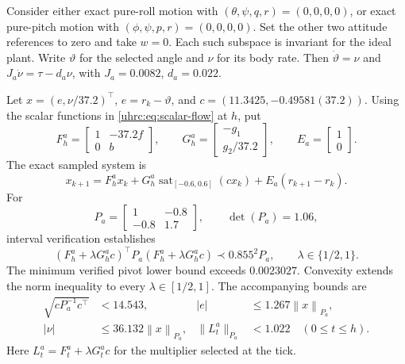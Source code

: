 \documentclass[12pt, a4paper]{article}
\begin{document}
Consider either exact pure-roll motion with
$(\theta,\psi,q,r)=(0,0,0,0)$, or exact pure-pitch motion with
$(\phi,\psi,p,r)=(0,0,0,0)$. Set the other two attitude references to zero
and take $w=0$. Each such subspace is invariant for the ideal plant.
Write $\vartheta$ for the selected angle and $\nu$ for its body rate.
Then $\dot\vartheta=\nu$ and
$J_a\dot\nu=\tau-d_a\nu$, with $J_a=0.0082$, $d_a=0.022$.

Let $x=(e,\nu/37.2)^\top$, $e=r_k-\vartheta$, and
$c=(11.3425,-0.49581(37.2))$.
Using the scalar functions in \eqref{uhrc:eq:scalar-flow} at $h$, put
\begin{equation}
 F_h^a=\begin{bmatrix}1&-37.2f\\0&b\end{bmatrix},\qquad
 G_h^a=\begin{bmatrix}-g_1\\g_2/37.2\end{bmatrix},\qquad
 E_a=\begin{bmatrix}1\\0\end{bmatrix}.
 \label{uhrc:eq:planar-maps}
\end{equation}
The exact sampled system is
\begin{equation}
 x_{k+1}=F_h^ax_k+G_h^a\operatorname{sat}_{[-0.6,0.6]}(cx_k)
                              +E_a(r_{k+1}-r_k).
 \label{uhrc:eq:planar-dynamics}
\end{equation}
For
\begin{equation}
 P_a=\begin{bmatrix}1&-0.8\\-0.8&1.7\end{bmatrix},
 \qquad \det(P_a)=1.06,
 \label{uhrc:eq:Pa}
\end{equation}
interval verification establishes
\begin{equation}
 (F_h^a+\lambda G_h^ac)^\top P_a(F_h^a+\lambda G_h^ac)
 \prec0.855^2P_a,\qquad\lambda\in\{1/2,1\}.
 \label{uhrc:eq:planar-certificate}
\end{equation}
The minimum verified pivot lower bound exceeds $0.0023027$.
Convexity extends the norm inequality to every $\lambda\in[1/2,1]$.
The accompanying bounds are
\begin{align}
 \sqrt{cP_a^{-1}c^\top}&<14.543,&
 |e|&\le1.267\left\lVert x\right\rVert_{P_a},\nonumber\\
 |\nu|&\le36.132\left\lVert x\right\rVert_{P_a},&
 \|L_t^a\|_{P_a}&<1.022\quad(0\le t\le h).
 \label{uhrc:eq:planar-bounds}
\end{align}
Here $L_t^a=F_t^a+\lambda G_t^ac$ for the multiplier selected at the tick.
\end{document}
